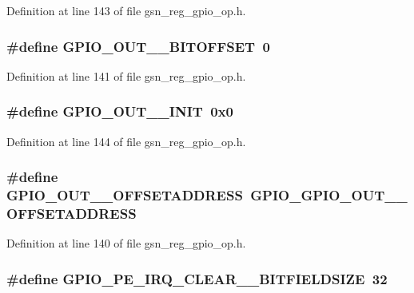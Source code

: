 Definition at line 143 of file gsn\_\-reg\_\-gpio\_\-op.h.

\hypertarget{a00553_a69e8921d792180ea973d2595554e24c3}{
\subsubsection[{GPIO\_\-OUT\_\-1\_\-BITOFFSET}]{\setlength{\rightskip}{0pt plus 5cm}\#define GPIO\_\-OUT\_\_\-BITOFFSET~0}}
\label{a00553_a69e8921d792180ea973d2595554e24c3}


Definition at line 141 of file gsn\_\-reg\_\-gpio\_\-op.h.

\hypertarget{a00553_a123f41f6c9f3350f1a4cda6ab71e636f}{
\subsubsection[{GPIO\_\-OUT\_\-1\_\-INIT}]{\setlength{\rightskip}{0pt plus 5cm}\#define GPIO\_\-OUT\_\_\-INIT~0x0}}
\label{a00553_a123f41f6c9f3350f1a4cda6ab71e636f}


Definition at line 144 of file gsn\_\-reg\_\-gpio\_\-op.h.

\hypertarget{a00553_a839b7038c8d6cd465427d79a539b8813}{
\subsubsection[{GPIO\_\-OUT\_\-1\_\-OFFSETADDRESS}]{\setlength{\rightskip}{0pt plus 5cm}\#define GPIO\_\-OUT\_\_\-OFFSETADDRESS~GPIO\_\-GPIO\_\-OUT\_\_\-OFFSETADDRESS}}
\label{a00553_a839b7038c8d6cd465427d79a539b8813}


Definition at line 140 of file gsn\_\-reg\_\-gpio\_\-op.h.

\hypertarget{a00553_a4ac6e20dd0a129f61297428c6c927222}{
\subsubsection[{GPIO\_\-PE\_\-IRQ\_\-CLEAR\_\-0\_\-BITFIELDSIZE}]{\setlength{\rightskip}{0pt plus 5cm}\#define GPIO\_\-PE\_\-IRQ\_\-CLEAR\_\_\-BITFIELDSIZE~32}}
\label{a00553_a4ac6e20dd0a129f61297428c6c927222}


